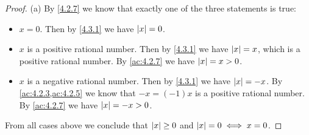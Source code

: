 \begin{proof}{(a)}
  By \cref{4.2.7} we know that exactly one of the three statements is true:
  \begin{itemize}
    \item \(x = 0\).
          Then by \cref{4.3.1} we have \(\left\lvert x\right\rvert = 0\).
    \item \(x\) is a positive rational number.
          Then by \cref{4.3.1} we have \(\left\lvert x\right\rvert = x\), which is a positive rational number.
          By \cref{ac:4.2.7} we have \(\left\lvert x\right\rvert = x > 0\).
    \item \(x\) is a negative rational number.
          Then by \cref{4.3.1} we have \(\left\lvert x\right\rvert = -x\).
          By \cref{ac:4.2.3,ac:4.2.5} we know that \(-x = (-1)x\) is a positive rational number.
          By \cref{ac:4.2.7} we have \(\left\lvert x\right\rvert = -x > 0\).
  \end{itemize}
  From all cases above we conclude that \(\left\lvert x\right\rvert \geq 0\) and \(\left\lvert x\right\rvert = 0 \iff x = 0\).
\end{proof}


